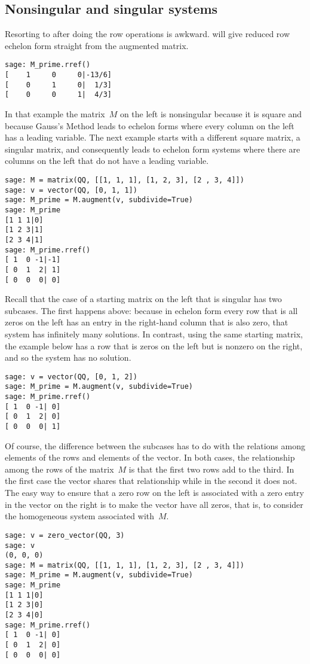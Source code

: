 \subsection{Nonsingular and singular systems}
Resorting to  after doing the row operations is awkward.
\Sage{} will give reduced row echelon form straight from the augmented matrix.
\begin{lstlisting}
sage: M_prime.rref()
[    1     0     0|-13/6]
[    0     1     0|  1/3]
[    0     0     1|  4/3]
\end{lstlisting}

In that example the matrix~$M$ on the left is nonsingular because it is 
square and because Gauss's Method leads to echelon forms where every
column on the left has a leading variable.
The next example starts with a different square matrix, a 
singular matrix, and consequently leads to 
echelon form systems where there are columns on the left 
that do not have a leading variable. 
\begin{lstlisting}
sage: M = matrix(QQ, [[1, 1, 1], [1, 2, 3], [2 , 3, 4]])    
sage: v = vector(QQ, [0, 1, 1]) 
sage: M_prime = M.augment(v, subdivide=True)
sage: M_prime
[1 1 1|0]
[1 2 3|1]
[2 3 4|1]
sage: M_prime.rref()
[ 1  0 -1|-1]
[ 0  1  2| 1]
[ 0  0  0| 0]  
\end{lstlisting}
Recall that the case of a starting matrix on the left that is singular 
has two subcases.
The first happens above: because in echelon form
every row that is all zeros on the
left has an entry in the right-hand column that is also zero,
that system has infinitely many solutions.
In contrast, using the same starting matrix,
the example below has a row that is zeros on the left but is nonzero
on the right, and so the system has no solution.
\begin{lstlisting}
sage: v = vector(QQ, [0, 1, 2])             
sage: M_prime = M.augment(v, subdivide=True)
sage: M_prime.rref()                        
[ 1  0 -1| 0]
[ 0  1  2| 0]
[ 0  0  0| 1]
\end{lstlisting}
Of course, the difference between the subcases
has to do with the relations among elements of 
the rows and elements of the vector.
In both cases, the relationship among the rows of the matrix~$M$
is that the first two rows add to the third.
In the first case the vector shares that relationship while in the second
it does not.
The easy way to ensure that a zero row on the left is associated with a zero
entry in the vector on the right is to make the vector have all zeros, that is,
to consider the homogeneous system associated with~$M$.
\begin{lstlisting}
sage: v = zero_vector(QQ, 3)
sage: v
(0, 0, 0)
sage: M = matrix(QQ, [[1, 1, 1], [1, 2, 3], [2 , 3, 4]]) 
sage: M_prime = M.augment(v, subdivide=True)
sage: M_prime
[1 1 1|0]
[1 2 3|0]
[2 3 4|0]
sage: M_prime.rref()
[ 1  0 -1| 0]
[ 0  1  2| 0]
[ 0  0  0| 0]
\end{lstlisting}


